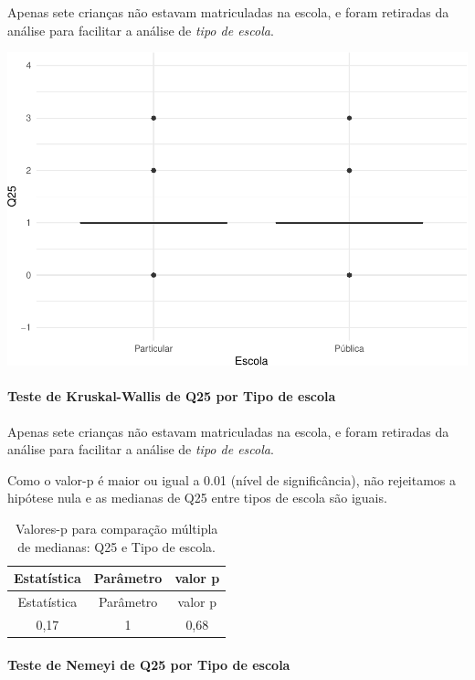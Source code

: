 \documentclass[]{article}
\let\oldparagraph\paragraph
\renewcommand{\paragraph}[1]{\oldparagraph{#1}\mbox{}}
\begin{document}
Apenas sete crianças não estavam matriculadas na escola, e foram retiradas da análise para facilitar a análise de \emph{tipo de escola}.

\begin{center}\includegraphics[width=0.75\linewidth]{relatorio_covid19_files/figure-latex/unnamed-chunk-706-1} \end{center}

\hypertarget{teste-de-kruskal-wallis-de-q25-por-tipo-de-escola}{%
\paragraph{Teste de Kruskal-Wallis de Q25 por Tipo de escola}\label{teste-de-kruskal-wallis-de-q25-por-tipo-de-escola}}

Apenas sete crianças não estavam matriculadas na escola, e foram retiradas da análise para facilitar a análise de \emph{tipo de escola}.

Como o valor-p é maior ou igual a 0.01 (nível de significância), não rejeitamos a hipótese nula e as medianas de Q25 entre tipos de escola são iguais.

\begin{longtable}[]{@{}ccc@{}}
\caption{\label{tab:unnamed-chunk-708}Valores-p para comparação múltipla de medianas: Q25 e Tipo de escola.}\tabularnewline
\toprule
Estatística & Parâmetro & valor p\tabularnewline
\midrule
\endfirsthead
\toprule
Estatística & Parâmetro & valor p\tabularnewline
\midrule
\endhead
0,17 & 1 & 0,68\tabularnewline
\bottomrule
\end{longtable}

\hypertarget{teste-de-nemeyi-de-q25-por-tipo-de-escola}{%
\paragraph{Teste de Nemeyi de Q25 por Tipo de escola}\label{teste-de-nemeyi-de-q25-por-tipo-de-escola}}
\end{document}
